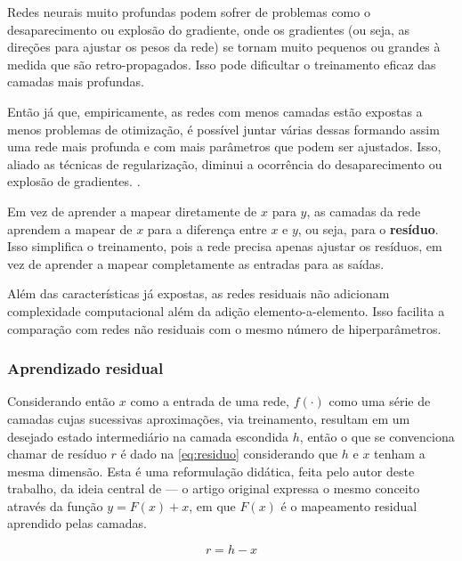 			\par Redes neurais muito profundas podem sofrer de problemas como o desaparecimento ou explosão do gradiente, onde os gradientes (ou seja, as direções para ajustar os pesos da rede) se tornam muito pequenos ou grandes à medida que são retro-propagados. Isso pode dificultar o treinamento eficaz das camadas mais profundas.

			\par Então já que, empiricamente, as redes com menos camadas estão expostas a menos problemas de otimização, é possível juntar várias dessas formando assim uma rede mais profunda e com mais parâmetros que podem ser ajustados. Isso, aliado as técnicas de regularização, diminui a ocorrência do desaparecimento ou explosão de gradientes. \cite{DBLP:journals/corr/HeZRS15}. 
			
			\par Em vez de aprender a mapear diretamente de $x$ para $y$, as camadas da rede aprendem a mapear de $x$ para a diferença entre $x$ e $y$, ou seja, para o \textbf{resíduo}. Isso simplifica o treinamento, pois a rede precisa apenas ajustar os resíduos, em vez de aprender a mapear completamente as entradas para as saídas.
			
			\par Além das características já expostas, as redes residuais não adicionam complexidade computacional além da adição elemento-a-elemento. Isso facilita a comparação com redes não residuais com o mesmo número de hiperparâmetros.
			
			\subsubsection{Aprendizado residual}
			
				\par Considerando então $x$ como a entrada de uma rede, $f(\cdot)$ como uma série de camadas cujas sucessivas aproximações, via treinamento, resultam em um desejado  estado intermediário na camada escondida $h$, então o que se convenciona chamar de resíduo $r$ é dado na \autoref{eq:residuo} considerando que $h$ e $x$ tenham a mesma dimensão. Esta é uma reformulação didática, feita pelo autor deste trabalho, da ideia central de  --- o artigo original expressa o mesmo conceito através da função $y=F(x)+x$, em que $F(x)$ é o mapeamento residual aprendido pelas camadas.
				
				
				\begin{equation}
					\label{eq:residuo}
					r = h - x
				\end{equation}
			
